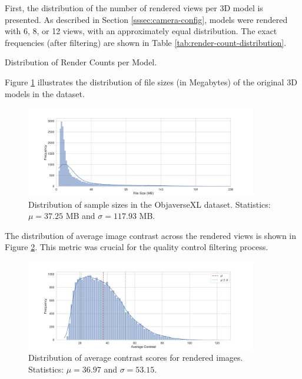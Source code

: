 First, the distribution of the number of rendered views per 3D model is presented. As described in Section \ref{sssec:camera-config}, models were rendered with 6, 8, or 12 views, with an approximately equal distribution. The exact frequencies (after filtering) are shown in Table \ref{tab:render-count-distribution}.

\begin{table}[h]
  \centering
  \caption{Distribution of Render Counts per Model.}
  \label{tab:render-count-distribution}
\end{table}

Figure \ref{fig:dist-file-size} illustrates the distribution of file sizes (in Megabytes) of the original 3D models in the dataset.

\begin{figure}[h]
  \centering
  \includegraphics[width=0.9\textwidth]{images/data/objaverse_visualizations/distribution_file_size_bytes.jpeg}
  \caption{Distribution of sample sizes in the ObjaverseXL dataset. Statistics: $\mu = 37.25$ MB and $\sigma = 117.93$ MB.}
  \label{fig:dist-file-size}
\end{figure}

The distribution of average image contrast across the rendered views is shown in Figure \ref{fig:dist-avg-contrast}. This metric was crucial for the quality control filtering process.

\begin{figure}[h]
  \centering
  \includegraphics[width=0.9\textwidth]{images/data/objaverse_visualizations/distribution_average_contrast.jpeg}
  \caption{Distribution of average contrast scores for rendered images. Statistics: $\mu = 36.97$ and $\sigma = 53.15$.}
  \label{fig:dist-avg-contrast}
\end{figure}

